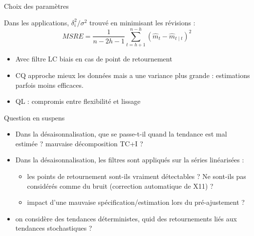 \documentclass[10pt,xcolor=table,color={dvipsnames,usenames},ignorenonframetext,usepdftitle=false,french]{beamer}
\begin{document}
\begin{frame}{Choix des paramètres}
\protect\hypertarget{choix-des-paramuxe8tres}{}

Dans les applications, \(\delta_i^2/\sigma^2\) trouvé en minimisant les
révisions : \[
MSRE=\frac{1}{n-2h-1}\sum_{t=h+1}^{n-h}(\hat{m}_{t}-\hat{m}_{t\mid t})^{2}
\] \pause

\begin{itemize}
\item
  Avec filtre LC biais en cas de point de retournement
\item
  CQ approche mieux les données mais a une variance plus grande :
  estimations parfois moins efficaces.
\item
  QL : compromis entre flexibilité et lissage
\end{itemize}

\end{frame}

\begin{frame}{Question en suspens}
\protect\hypertarget{question-en-suspens}{}

\begin{itemize}
\item
  Dans la désaisonnalisation, que se passe-t-il quand la tendance est
  mal estimée ? mauvaise décomposition TC+I ?
\item
  Dans la désaisonnalisation, les filtres sont appliqués sur la séries
  linéarisées :

  \begin{itemize}
  \item
    les points de retournement sont-ils vraiment détectables ? Ne
    sont-ils pas considérés comme du bruit (correction automatique de
    X11) ?
  \item
    impact d'une mauvaise spécification/estimation lors du
    pré-ajustement ?
  \end{itemize}
\item
  on considère des tendances déterministes, quid des retournements liés
  aux tendances stochastiques ?
\end{itemize}

\end{frame}
\end{document}
